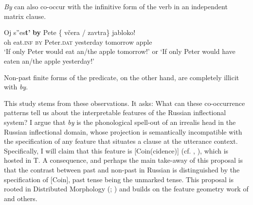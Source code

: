 \documentclass[output=paper,
modfonts,
newtxmath,
hidelinks,
]{langscibook}
\begin{document}
\noindent \textit{By} can also co-occur with the infinitive form of the verb in an independent matrix clause.

\ea \label{10:ex3}
\gll Oj s”es\textbf{t’} \textbf{by} Pete \{\hspace{-2pt} včera / zavtra\} jabloko!\\
     oh eat.\textsc{inf} \textsc{by} Peter.\textsc{dat} {} yesterday {} tomorrow apple\\
\glt `If only Peter would eat an/the apple tomorrow!' or
\glt `If only Peter would have eaten an/the apple yesterday!'\\\hfill \citep[10]{Asarina2006}
\z

\noindent Non-past finite forms of the predicate, on the other hand, are completely illicit with \textit{by}.

\ea \label{10:ex4}
	\z
\z

\noindent This study stems from these observations. It asks: What can these co-occurrence patterns tell us about the interpretable features of the Russian inflectional system? I argue that \textit{by} is the phonological spell-out of an irrealis head in the Russian inflectional domain, whose projection is semantically incompatible with the specification of any feature that situates a clause at the utterance context. Specifically, I will claim that this feature is [Coin(cidence)] (cf. \citealt{RitterWiltschko2005}, \citealt{RitterWiltschko2009}), which is hosted in T. A consequence, and perhaps the main take-away of this proposal is that the contrast between past and non-past in Russian is distinguished by the specification of [Coin], past tense being the unmarked tense. This proposal is rooted in Distributed Morphology (\citealt{HalleMarantz1993}; \citealt{EmbickNoyer2007}) and builds on the feature geometry work of \citet{Cowper2002,Cowper2005} and others.
\end{document}
